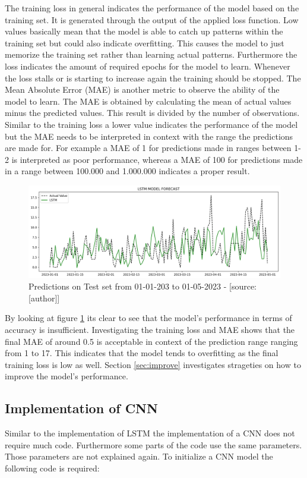 The training loss in general indicates the performance of the model based on the training set. It is generated through the output of the applied loss function. Low values basically mean that the model is able to catch up patterns within the training set but could also indicate overfitting. This causes the model to just memorize the training set rather than learning actual patterns. Furthermore the loss indicates the amount of required epochs for the model to learn. Whenever the loss stalls or is starting to increase again the training should be stopped. The Mean Absolute Error (MAE) is another metric to observe the ability of the model to learn. The MAE is obtained by calculating the mean of actual values minus the predicted values. This result is divided by the number of observations.\cite{mae} Similar to the training loss a lower value indicates the performance of the model but the MAE needs to be interpreted in context with the range the predictions are made for. For example a MAE of 1 for predictions made in ranges between 1-2 is interpreted as poor performance, whereas a MAE of 100 for predictions made in a range between 100.000 and 1.000.000 indicates a proper result.

\begin{figure}[H]
	\centering
		\includegraphics[width=14cm]{images/lstm_1_prediction}
	\caption{Predictions on Test set from 01-01-203 to 01-05-2023 - [source:[author]]}
	\label{fig:lstm_1_training_test}
\end{figure}
By looking at figure \ref{fig:lstm_1_training_test} its clear to see that the model's performance in terms of accuracy is insufficient. Investigating the training loss and MAE shows that the final MAE of around 0.5 is acceptable in context of the prediction range ranging from 1 to 17. This indicates that the model tends to overfitting as the final training loss is low as well. Section \ref{sec:improve} investigates strageties on how to improve the model's performance.

\subsection{Implementation of CNN}
Similar to the implementation of LSTM the implementation of a CNN does not require much code. Furthermore some parts of the code use the same parameters. Those parameters are not explained again. To initialize a CNN model the following code is required: 


